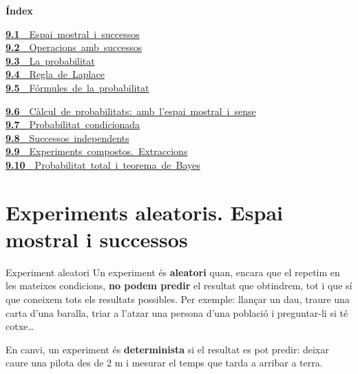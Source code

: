 \documentclass[11pt,a4paper]{article}
\begin{document}
\begin{tcolorbox}[colback=fmsurface,colframe=fmsurface,arc=3mm,left=4mm,right=4mm,top=2mm,bottom=2mm]
\small\textbf{Índex}\par\smallskip
\begin{minipage}[t]{0.42\linewidth}\small \mbox{\hyperlink{sec1}{\textbf{\color{fmgreen}9.1}\ \ Espai mostral i successos}}\\[3pt]
\mbox{\hyperlink{sec2}{\textbf{\color{fmgreen}9.2}\ \ Operacions amb successos}}\\[3pt]
\mbox{\hyperlink{sec3}{\textbf{\color{fmgreen}9.3}\ \ La probabilitat}}\\[3pt]
\mbox{\hyperlink{sec4}{\textbf{\color{fmgreen}9.4}\ \ Regla de Laplace}}\\[3pt]
\mbox{\hyperlink{sec5}{\textbf{\color{fmgreen}9.5}\ \ Fórmules de la probabilitat}}\\[3pt]\end{minipage}\hfill\begin{minipage}[t]{0.56\linewidth}\small \mbox{\hyperlink{sec6}{\textbf{\color{fmgreen}9.6}\ \ Càlcul de probabilitats: amb l'espai mostral i sense}}\\[3pt]
\mbox{\hyperlink{sec7}{\textbf{\color{fmgreen}9.7}\ \ Probabilitat condicionada}}\\[3pt]
\mbox{\hyperlink{sec8}{\textbf{\color{fmgreen}9.8}\ \ Successos independents}}\\[3pt]
\mbox{\hyperlink{sec9}{\textbf{\color{fmgreen}9.9}\ \ Experiments compostos. Extraccions}}\\[3pt]
\mbox{\hyperlink{sec10}{\textbf{\color{fmgreen}9.10}\ \ Probabilitat total i teorema de Bayes}}\\[3pt]\end{minipage}
\end{tcolorbox}

\section{Experiments aleatoris. Espai mostral i successos}\hypertarget{sec1}{}

  

  
\begin{fmdef}{Experiment aleatori}
Un experiment és \textbf{aleatori} quan, encara que el repetim en les mateixes condicions, \textbf{no podem predir} el resultat que obtindrem, tot i que sí que coneixem tots els resultats possibles. Per exemple: llançar un dau, traure una carta d'una baralla, triar a l'atzar una persona d'una població i preguntar-li si té cotxe\dots{}

      

En canvi, un experiment és \textbf{determinista} si el resultat es pot predir: deixar caure una pilota des de 2 m i mesurar el temps que tarda a arribar a terra.
\end{fmdef}
\end{document}
